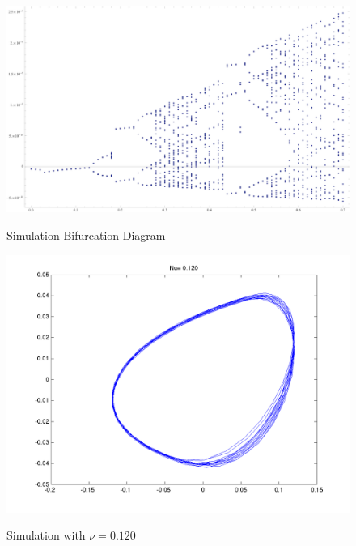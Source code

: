 \documentclass[12pt]{report}
\begin{document}
	\begin{figure}[h]
		\centering
		\includegraphics{simulations/circuit.png}
		\label{fig: Simulation Bifurcation Diagram}
		\caption{Simulation Bifurcation Diagram}
	\end{figure}

	\begin{figure}
		\centering
		\includegraphics{simulations/plotnu0120.png}
		\label{fig:sim.0120}
		\caption{Simulation with $\nu=0.120$}
	\end{figure}
	
\end{document}
